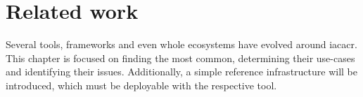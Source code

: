 \chapter{Related work}



Several tools, frameworks and even whole ecosystems have evolved around \gls{iacacr}. This chapter is focused on finding the most common, determining their use-cases and identifying their issues.
Additionally, a simple reference infrastructure will be introduced, which must be deployable with the respective tool.


